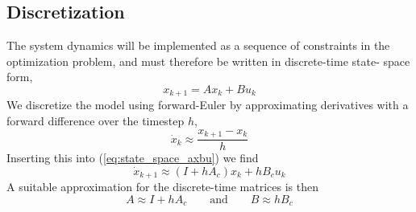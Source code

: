 \subsection{Discretization}
The system dynamics will be implemented as a sequence of constraints in the
optimization problem, and must therefore be written in discrete-time state-
space form,
\begin{equation}
	x_{k+1} = Ax_k + Bu_k
	\label{eq:discrete_state_space_axbu}
\end{equation}
We discretize the model using forward-Euler by approximating derivatives
with a forward difference over the timestep $h$,
\begin{equation}
	\dot{x}_k \approx \frac{x_{k+1} - x_k}{h}
\end{equation}
Inserting this into (\ref{eq:state_space_axbu}) we find
\begin{equation}
	\dot{x}_{k+1} \approx (I + hA_c) x_k + hB_c u_k
\end{equation}
A suitable approximation for the discrete-time matrices is then
\begin{equation}
	A \approx I + hA_c
	\qquad\text{and}\qquad
	B \approx hB_c
\end{equation}


